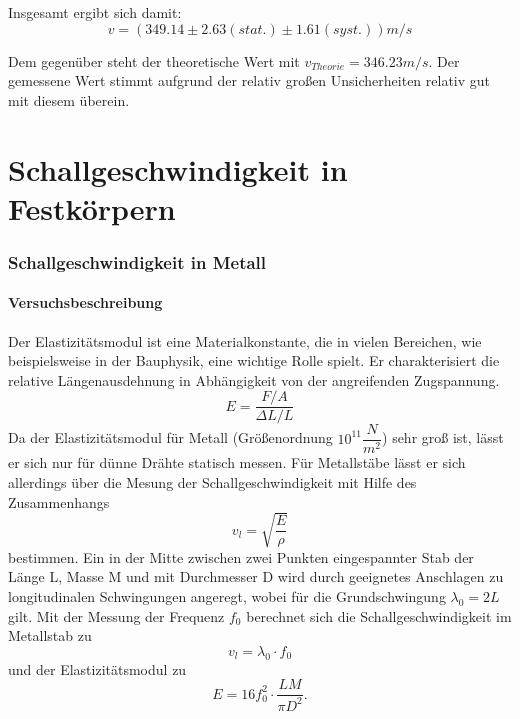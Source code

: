 \documentclass[12pt,a4paper]{article}
\begin{document}
Insgesamt ergibt sich damit:
\begin{equation}
v=(349.14 \pm 2.63(stat.) \pm 1.61(syst.))m/s
\end{equation}

Dem gegenüber steht der theoretische Wert mit $v_{Theorie}=346.23m/s$. Der gemessene Wert stimmt aufgrund der relativ großen Unsicherheiten relativ gut mit diesem überein.














\part{Schallgeschwindigkeit in Festkörpern}
\section{Schallgeschwindigkeit in Metall}
\subsection{Versuchsbeschreibung}
Der Elastizitätsmodul ist eine Materialkonstante, die in vielen Bereichen, wie beispielsweise in der Bauphysik, eine wichtige Rolle spielt. Er charakterisiert die relative Längenausdehnung in Abhängigkeit von der angreifenden Zugspannung.
\begin{equation}
E = \dfrac{F/A}{\Delta L/L}
\end{equation}
Da der Elastizitätsmodul für Metall (Größenordnung $10^{11} \dfrac{N}{m^2}$) sehr groß ist, lässt er sich nur für dünne Drähte statisch messen. Für Metallstäbe lässt er sich allerdings über die Mesung der Schallgeschwindigkeit mit Hilfe des Zusammenhangs 
\begin{equation}
v_l = \sqrt{\dfrac{E}{\rho}}
\label{eq:001}
\end{equation}
bestimmen. Ein in der Mitte zwischen zwei Punkten eingespannter Stab der Länge L, Masse M und mit Durchmesser D wird durch geeignetes Anschlagen zu longitudinalen Schwingungen angeregt, wobei für die Grundschwingung $\lambda_0 = 2L$ gilt. Mit der Messung der Frequenz $f_0$ berechnet sich die Schallgeschwindigkeit im Metallstab zu
\begin{equation}
v_l = \lambda_0 \cdot f_0
\label{eq:002}
\end{equation}
und der Elastizitätsmodul zu
\begin{equation}
E = 16 f_0^2 \cdot \dfrac{L M}{\pi D^2}.
\label{eq:003}
\end{equation}
\end{document}
